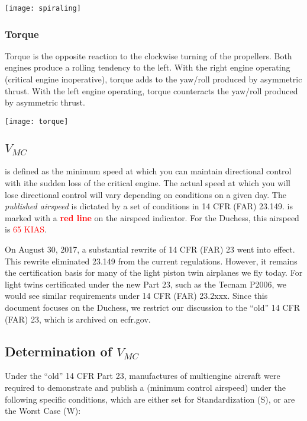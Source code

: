 \begin{center}
\texttt{[image: spiraling]}
\end{center}

\subsubsection{Torque}

Torque is the opposite reaction to the clockwise turning of the propellers. Both engines produce a rolling tendency
to the left. With the right engine operating (critical engine inoperative), torque adds to the yaw/roll produced by
asymmetric thrust. With the left engine operating, torque counteracts the yaw/roll produced by asymmetric thrust.

\begin{center}
\texttt{[image: torque]}
\end{center}

\subsection{$V_{MC}$}

\vmc is defined as the minimum speed at which you can maintain directional control
with ithe sudden loss of the critical engine. The actual speed at which you will
lose directional control will vary depending on conditions on a
given day. The \emph{published \vmc airspeed} is dictated by a set of conditions in
14 CFR (FAR) 23.149. \vmc is marked with a \textbf{\textcolor{red}{red line}} on the airspeed indicator.
For the Duchess, this airspeed is \textcolor{red}{65 KIAS}.

On August 30, 2017, a substantial rewrite of 14 CFR (FAR) 23 went into effect. This
rewrite eliminated 23.149 from the current regulations. However, it remains the
certification basis for many of the light piston twin airplanes we fly today. For
light twins certificated under the new Part 23, such as the Tecnam P2006, we would
see similar requirements under 14 CFR (FAR) 23.2xxx. Since this document focuses on
the Duchess, we restrict our discussion to the ``old'' 14 CFR (FAR) 23, which is
archived on ecfr.gov.

\subsection{Determination of $V_{MC}$}

Under the ``old'' 14 CFR Part 23, manufactures of multiengine aircraft were required to demonstrate and publish a \vmc
(minimum control airspeed) under the following specific conditions, which are either set for Standardization (S), or are the Worst Case (W):

